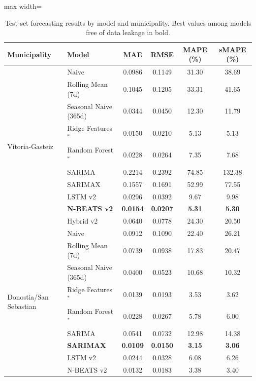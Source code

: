﻿\documentclass[12pt,reqno, twoside]{amsbook}
\numberwithin{figure}{chapter}
\numberwithin{table}{chapter}
\numberwithin{equation}{chapter}
\theoremstyle{plain}
\numberwithin{equation}{chapter}
\numberwithin{section}{chapter}
\begin{document}
\begin{table}[htbp]
\centering
\caption{Test-set forecasting results by model and municipality. Best values among models free of data leakage in bold.}
\label{tab:forecast_results}
\begin{adjustbox}{max width=\textwidth}
\begin{tabular}{llcccc}
\toprule
\textbf{Municipality} & \textbf{Model} & \textbf{MAE} & \textbf{RMSE} & \textbf{\ac{MAPE} (\%)} & \textbf{s\ac{MAPE} (\%)} \\
\midrule
\multirow{10}{*}{Vitoria-Gasteiz}
  & Naive                  & 0.0986 & 0.1149 & 31.30 & 38.69 \\
  & Rolling Mean (7d)      & 0.1045 & 0.1205 & 33.31 & 41.65 \\
  & Seasonal Naive (365d)  & 0.0344 & 0.0450 & 12.30 & 11.79 \\
  & Ridge Features$^{*}$ & 0.0150 & 0.0210 &  5.13 &  5.13 \\
  & Random Forest$^{*}$ & 0.0228 & 0.0264 &  7.35 &  7.68 \\
  & \ac{SARIMA}                 & 0.2214 & 0.2392 & 74.85 & 132.38 \\
  & \ac{SARIMAX}                & 0.1557 & 0.1691 & 52.99 &  77.55 \\
  & \ac{LSTM} v2                & 0.0296 & 0.0392 &  9.67 &   9.98 \\
  & \textbf{N-BEATS v2}    & \textbf{0.0154} & \textbf{0.0207} & \textbf{5.31} & \textbf{5.30} \\
  & Hybrid v2              & 0.0640 & 0.0778 & 24.30 &  20.50 \\
\midrule
\multirow{10}{*}{Donostia/San Sebastian}
  & Naive                  & 0.0912 & 0.1090 & 22.40 & 26.21 \\
  & Rolling Mean (7d)      & 0.0739 & 0.0938 & 17.83 & 20.47 \\
  & Seasonal Naive (365d)  & 0.0400 & 0.0523 & 10.68 & 10.32 \\
  & Ridge Features$^{*}$ & 0.0139 & 0.0193 &  3.53 &  3.62 \\
  & Random Forest$^{*}$ & 0.0228 & 0.0267 &  5.78 &  6.00 \\
  & \ac{SARIMA}                 & 0.0541 & 0.0732 & 12.98 & 14.38 \\
  & \textbf{\ac{SARIMAX}}       & \textbf{0.0109} & \textbf{0.0150} & \textbf{3.15} & \textbf{3.06} \\
  & \ac{LSTM} v2                & 0.0244 & 0.0328 &  6.08 &   6.26 \\
  & N-BEATS v2             & 0.0132 & 0.0183 &  3.38 &   3.40 \\

\end{tabular}
\end{adjustbox}
\end{table}
\end{document}
